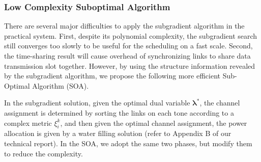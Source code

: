 \documentclass[conference]{IEEEtran}
\begin{document}
\subsubsection{Low Complexity Suboptimal Algorithm}
\label{sec:sub-algorithm}
There are several major difficulties to apply the subgradient algorithm in the practical system. First, despite its polynomial complexity, the subgradient search still converges too slowly to be useful for the scheduling on a fast scale. Second, the time-sharing result will cause overhead of synchronizing links to share data transmission slot together. However,  by using the structure information revealed by the subgradient algorithm, we propose the following more efficient Sub-Optimal Algorithm (SOA).

In the subgradient solution, given the optimal dual variable $\boldsymbol{\lambda}^*$, the channel assignment is determined by sorting the links on each tone according to a complex metric $\xi_{i}^k$, and then given the optimal channel assignment, the power allocation is given by a water filling solution (refer to Appendix B of our technical report). In the SOA, we adopt the same two phases, but modify them to reduce the complexity.
\end{document}
